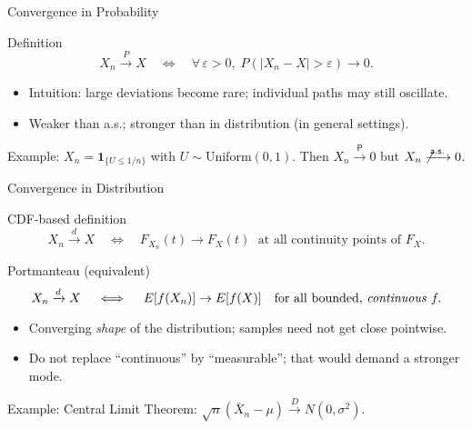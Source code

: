 \documentclass[aspectratio=43]{beamer}
\def\E{E}%
\def\mathbb#1{#1}%
\def\mathcal#1{#1}%
\newcommand{\E}{\mathbb{E}}
\newcommand{\1}{\mathbf{1}}
\newcommand{\toP}{\xrightarrow{\,\mathsf{P}\,}}
\newcommand{\toas}{\xrightarrow{\,\mathsf{a.s.}\,}}
\newcommand{\tod}{\xrightarrow{\,\mathcal{D}\,}}
\begin{document}
\begin{frame}{Convergence in Probability}
  \begin{block}{Definition}
    \[ X_n \xrightarrow{\mathbb{P}} X \quad \iff \quad \forall \, \varepsilon > 0,\; \mathbb{P}(|X_n - X| > \varepsilon) \to 0. \]
  \end{block}
  \begin{itemize}
    \item Intuition: large deviations become rare; individual paths may still oscillate.
    \item Weaker than a.s.; stronger than in distribution (in general settings).
  \end{itemize}
  {\centering
  }
  \medskip
  {\footnotesize Example: $X_n=\mathbf 1_{\{U\le 1/n\}}$ with $U\sim\mathrm{Uniform}(0,1)$. Then $X_n\toP 0$ but $X_n\not\toas 0$.}
\end{frame}

\begin{frame}{Convergence in Distribution}
  \begin{block}{CDF-based definition}
    \[ X_n \xrightarrow{d} X \quad \iff \quad F_{X_n}(t) \to F_X(t) \; \text{ at all continuity points of } F_X. \]
  \end{block}
  \begin{block}{Portmanteau (equivalent)}
    \[ X_n \xrightarrow{d} X \quad \iff \quad \E[f(X_n)] \to \E[f(X)] \quad \text{for all bounded, \emph{continuous} } f. \]
  \end{block}
  \begin{itemize}
    \item Converging \emph{shape} of the distribution; samples need not get close pointwise.
    \item Do not replace ``continuous'' by ``measurable''; that would demand a stronger mode.
  \end{itemize}
  {\centering
  }
  \medskip
  {\footnotesize Example: Central Limit Theorem: $\sqrt{n}(\bar X_n-\mu)\tod \mathcal N(0,\sigma^2)$.}
\end{frame}
\end{document}
